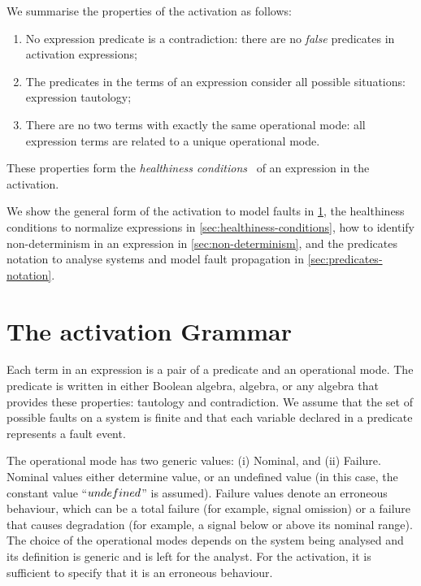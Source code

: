 \documentclass[12pt,openright,twoside,a4paper,oldfontcommands,english,brazil,final]{abntex2}
\theoremstyle{theo}
\def\undefinednominal{\ensuremath undefined}
\begin{document}
\begin{sloppypar}
We summarise the properties of the \ac{activation} as follows:
%
\begin{enumerate}
  \item No expression predicate is a contradiction: there are no \emph{false} predicates in activation expressions;
  \item The predicates in the terms of an expression consider all possible situations: expression tautology;
  \item There are no two terms with exactly the same operational mode: all expression terms are related to a unique operational mode.
\end{enumerate}
%
These properties form the \emph{healthiness conditions}~\cite{HH1998} of an expression in the \ac{activation}.
\end{sloppypar}

We show the general form of the \ac{activation} to model faults in \cref{sec:grammar}, the healthiness conditions to normalize expressions in \cref{sec:healthiness-conditions}, how to identify non-determinism in an expression in \cref{sec:non-determinism}, and the predicates notation to analyse systems and model fault propagation in \cref{sec:predicates-notation}.

\section{The \acl*{activation} Grammar}
\label{sec:grammar}

Each term in an expression is a pair of a predicate and an operational mode.
The predicate is written in either Boolean algebra, \ac{algebra}, or any algebra that provides these properties: tautology and contradiction.
We assume that the set of possible faults on a system is finite and that each variable declared in a predicate represents a fault event.

The operational mode has two generic values: (i) Nominal, and (ii) Failure.
Nominal values either determine value, or an undefined value (in this case, the constant value ``$\undefinednominal$'' is assumed).
Failure values denote an erroneous behaviour, which can be a total failure (for example, signal omission) or a failure that causes degradation (for example, a signal below or above its nominal range).
The choice of the operational modes depends on the system being analysed and its definition is generic and is left for the analyst.
For the \ac{activation}, it is sufficient to specify that it is an erroneous behaviour.
\end{document}
